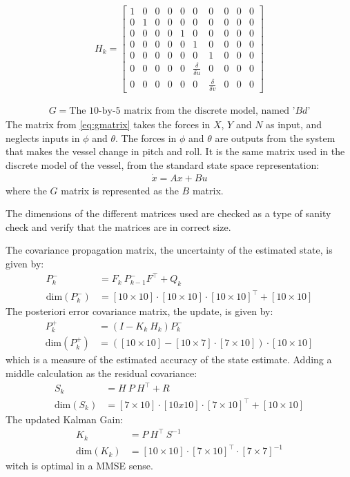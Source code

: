 \begin{align}
H_k =
\begin{bmatrix}
1 & 0 & 0 & 0 & 0 & 0 & 0 & 0 & 0 & 0 \\
0 & 1 & 0 & 0 & 0 & 0 & 0 & 0 & 0 & 0 \\
0 & 0 & 0 & 0 & 1 & 0 & 0 & 0 & 0 & 0 \\
0 & 0 & 0 & 0 & 0 & 1 & 0 & 0 & 0 & 0 \\
0 & 0 & 0 & 0 & 0 & 0 & 1 & 0 & 0 & 0 \\
0 & 0 & 0 & 0 & 0 & \frac{\delta}{\delta u} & 0 & 0 & 0 & 0 \\
0 & 0 & 0 & 0 & 0 & 0 & \frac{\delta}{\delta v} & 0 & 0 & 0
\end{bmatrix}
\end{align}

\begin{align}
G = \text{The 10-by-5 matrix from the discrete model, named '$Bd$'}
\label{eq:gmatrix}
\end{align}
The matrix from \ref{eq:gmatrix} takes the forces in $X$, $Y$ and $N$ as input, and neglects inputs in $\phi$ and $\theta$. The forces in $\phi$ and $\theta$ are outputs from the system that makes the vessel change in pitch and roll. It is the same matrix used in the discrete model of the vessel, from the standard state space representation:
\begin{align}
\dot x = Ax + Bu
\end{align}
where the $G$ matrix is represented as the $B$ matrix.

The dimensions of the different matrices used are checked as a type of sanity check and verify that the matrices are in correct size.

The covariance propagation matrix, the uncertainty of the estimated state, is given by:
\begin{align}
P_k^- &= F_k\ P_{k-1}^-F^\top + Q_k\\
\text{dim}(P_k^-) &= [10 \times 10]\cdot [10 \times 10]\cdot [10 \times 10]^\top + [10 \times 10]
\end{align}
The posteriori error covariance matrix, the update, is given by:
\begin{align}
P_k^+ &= (I - K_k\ H_k)P_k^-\\
\text{dim}(P_k^+) &= ([10 \times 10] - [10 \times 7]\cdot [7 \times 10])\cdot [10 \times 10]
\end{align}
which is a measure of the estimated accuracy of the state estimate. Adding a middle calculation as the residual covariance:
\begin{align}
S_k &= H\ P\ H^\top + R\\
\text{dim}(S_k) &= [7 \times 10]\cdot [10x10]\cdot [7 \times 10]^\top + [10 \times 10]
\end{align}
The updated Kalman Gain:
\begin{align}
K_k &= P\ H^\top\ S^{-1}\\
\text{dim}(K_k) &= [10 \times 10]\cdot [7 \times 10]^\top\cdot [7 \times 7]^{-1}
\end{align}
witch is optimal in a \ac{MMSE} sense.
